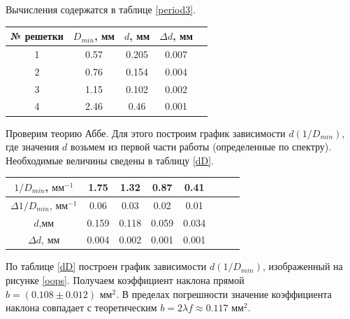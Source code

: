 \documentclass[a4paper,12pt]{article}
\begin{document}
Вычисления содержатся в таблице \ref{period3}. 


\begin{center}	
	\begin{tabular}{|c|c|c|c|c|}
		\hline
		№ решетки&$D_{min}$, мм&$d$, мм&$\Delta d$, мм\\
		\hline
		1&0.57&0.205&0.007\\
		\hline
		2&0.76&0.154&0.004\\
		\hline
		3&1.15&0.102&0.002\\
		\hline
		4&2.46&0.46&0.001\\
		\hline
	\end{tabular}
\label{period3}
\end{center}
 


Проверим теорию Аббе. Для этого построим график зависимости $d(1/D_{min})$, где значения $d$ возьмем из первой части работы (определенные по спектру). Необходимые величины сведены в таблицу \ref{dD}. 

\begin{center}
	\begin{tabular}{|c|c|c|c|c|c|c|c|}
		\hline
		$1/D_{min}$, $\text{мм}^{-1}$&1.75&1.32&0.87 & 0.41\\
		\hline
		$\Delta 1/D_{min}$, $\text{мм}^{-1}$&0.06&0.03&0.02 & 0.01\\
		\hline
		$d$,мм&0.159&0.118&0.059 & 0.034\\
		\hline
		$\Delta d$, мм&0.004&0.002&0.001 & 0.001\\
		\hline
	\end{tabular}	
	\label{dD}
\end{center}	



По таблице \ref{dD} построен график зависимости $d(1/D_{min})$, изображенный на рисунке \ref{oops}. Получаем коэффициент наклона прямой $b = (0.108 \pm 0.012) \text{ мм}^2$. В пределах погрешности значение коэффициента наклона совпадает с теоретическим $b = 2\lambda f \approx 0.117 \text{ мм}^2$.
\end{document}
